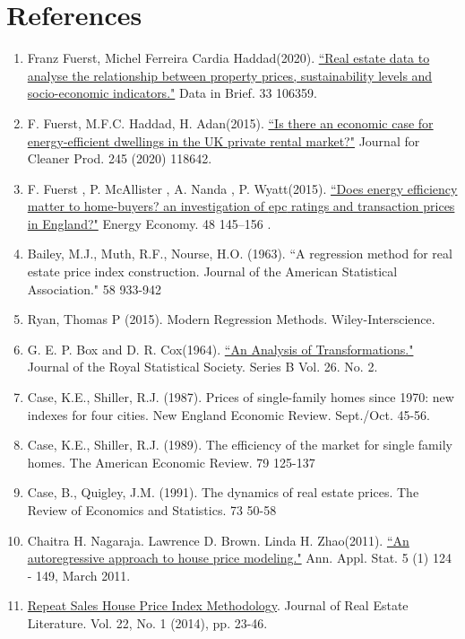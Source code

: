 \documentclass[12pt]{article}
\begin{document}
\section{References}
\begin{enumerate}
    \item Franz Fuerst, Michel Ferreira Cardia Haddad(2020). \href{https://doi.org/10.1016/j.dib.2020.106359}{``Real estate data to analyse the relationship between property prices, sustainability levels and socio-economic indicators."} Data in Brief. 33 106359.
    \item F. Fuerst, M.F.C. Haddad, H. Adan(2015). \href{https://doi.org/10.1016/j.jclepro.2019.118642}{``Is there an economic case for energy-efficient dwellings in the UK private rental market?"} Journal for Cleaner Prod. 245 (2020) 118642. 
    \item F. Fuerst , P. McAllister , A. Nanda , P. Wyatt(2015). \href{https://doi.org/10.1016/j.eneco.2014.12.012}{``Does  energy efficiency matter to home-buyers? an investigation of \acrshort{epc} ratings and transaction prices in England?"} Energy Economy. 48 145–156 .
    \item Bailey, M.J., Muth, R.F., Nourse, H.O. (1963). ``A regression method for real estate price index construction. Journal of the American Statistical Association." 58 933-942
    \item Ryan, Thomas P (2015). Modern Regression Methods. Wiley-Interscience.
    \item G. E. P. Box and D. R. Cox(1964). \href{https://www.jstor.org/stable/2984418}{``An Analysis of Transformations."} Journal of the Royal Statistical Society. Series B Vol. 26. No. 2.
    \item Case, K.E., Shiller, R.J. (1987). Prices of single-family homes since 1970: new indexes for four cities. New England Economic Review. Sept./Oct. 45-56. 
    \item Case, K.E., Shiller, R.J. (1989). The efficiency of the market for single family homes. The American Economic Review. 79 125-137
    \item Case, B., Quigley, J.M. (1991). The dynamics of real estate prices. The Review of Economics and Statistics. 73 50-58
    \item Chaitra H. Nagaraja. Lawrence D. Brown. Linda H. Zhao(2011). \href{https://doi.org/10.1214/10-AOAS380}{``An autoregressive approach to house price modeling."} Ann. Appl. Stat. 5 (1) 124 - 149, March 2011.
    \item \href{https://www.jstor.org/stable/24885063}{Repeat Sales House Price Index Methodology}. Journal of Real Estate Literature. Vol. 22, No. 1 (2014), pp. 23-46.
\end{enumerate}

\printglossary[type=\acronymtype]

\printglossary
\end{document}
